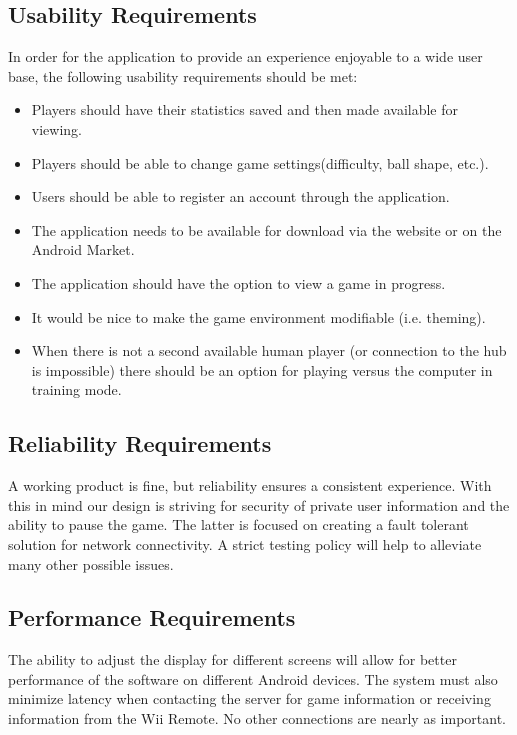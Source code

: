 \documentclass[12pt]{article}
\begin{document}
\subsection{Usability Requirements}
In order for the application to provide an experience enjoyable to a wide user base, the following usability requirements should be met:
\begin{itemize}
\item Players should have their statistics saved and then made available for viewing.
\item Players should be able to change game settings(difficulty, ball shape, etc.).
\item Users should be able to register an account through the application.
\item The application needs to be available for download via the website or on the Android Market.
\item The application should have the option to view a game in progress.
\item It would be nice to make the game environment modifiable (i.e. theming).
\item When there is not a second available human player (or connection to the hub is impossible) there should be an option for playing versus the computer in training mode.
\end{itemize}

\subsection{Reliability Requirements}
A working product is fine, but reliability ensures a consistent experience.  With this in mind our design is striving for security of private user information and the ability to pause the game.  The latter is focused on creating a fault tolerant solution for network connectivity.  A strict testing policy will help to alleviate many other possible issues.

\subsection{Performance Requirements}
The ability to adjust the display for different screens will allow for better performance of the software on different Android devices.  The system must also minimize latency when contacting the server for game information or receiving information from the Wii Remote.  No other connections are nearly as important.
\end{document}
